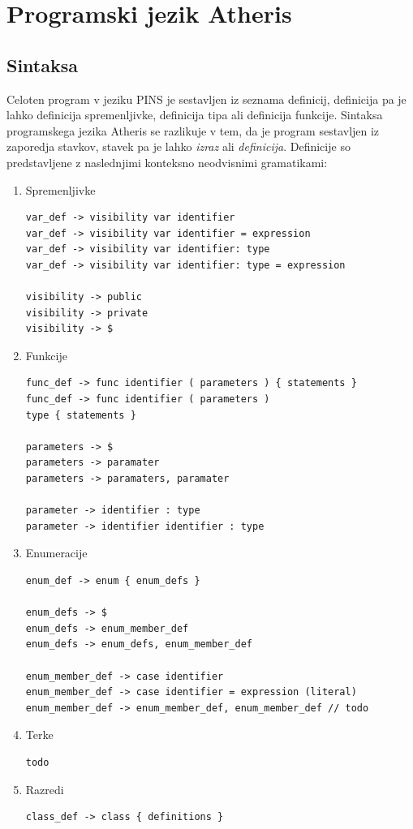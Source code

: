 \documentclass[a4paper, 12pt]{book}
\begin{document}
\chapter{Programski jezik Atheris}
\label{ch1}


\section{Sintaksa}

Celoten program v jeziku PINS je sestavljen iz seznama definicij, definicija pa je lahko definicija spremenljivke, definicija tipa ali definicija funkcije. Sintaksa programskega jezika Atheris se razlikuje v tem, da je program sestavljen iz zaporedja stavkov, stavek pa je lahko \textit{izraz} ali \textit{definicija}. Definicije so predstavljene z naslednjimi konteksno neodvisnimi gramatikami:

\begin{enumerate}
	\item Spremenljivke
\begin{lstlisting}[]
var_def -> visibility var identifier 
var_def -> visibility var identifier = expression
var_def -> visibility var identifier: type 
var_def -> visibility var identifier: type = expression 

visibility -> public
visibility -> private
visibility -> $
\end{lstlisting}
	\item Funkcije
\begin{lstlisting}[]
func_def -> func identifier ( parameters ) { statements }
func_def -> func identifier ( parameters ) 
type { statements }

parameters -> $
parameters -> paramater
parameters -> paramaters, paramater

parameter -> identifier : type
parameter -> identifier identifier : type
\end{lstlisting}	
	\item Enumeracije
	
\begin{lstlisting}
enum_def -> enum { enum_defs }

enum_defs -> $
enum_defs -> enum_member_def
enum_defs -> enum_defs, enum_member_def

enum_member_def -> case identifier
enum_member_def -> case identifier = expression (literal)
enum_member_def -> enum_member_def, enum_member_def // todo
\end{lstlisting}
	\item Terke
\begin{lstlisting}
todo
\end{lstlisting}
	\item Razredi
\begin{lstlisting}
class_def -> class { definitions }
\end{lstlisting}

\end{enumerate} 
\end{document}
